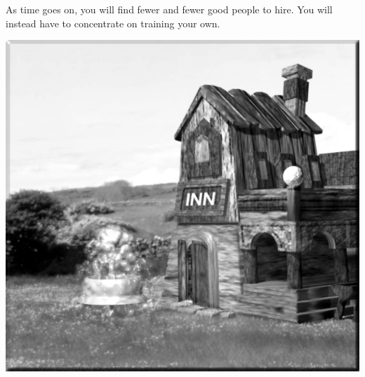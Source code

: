 As time goes on, you will find fewer and fewer good people to hire. You will instead have to concentrate on training your own.

\begin{center}
	\includegraphics[width=0.7\linewidth]{Ainn}
\end{center}